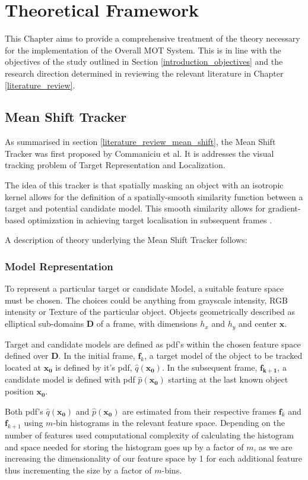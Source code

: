 \chapter{Theoretical Framework}

This Chapter aims to provide a comprehensive treatment of the theory necessary
for the implementation of the Overall MOT System. This is in line with the
objectives of the study outlined in Section \ref{introduction_objectives} and
the research direction determined in reviewing the relevant literature in
Chapter \ref{literature_review}.

\section{Mean Shift Tracker}
As summarised in section \ref{literature_review_mean_shift}, the Mean Shift Tracker was
first proposed by Commaniciu et al. It is addresses the
visual tracking problem of Target Representation and Localization.

The idea of this tracker is that spatially masking an object with an
isotropic kernel allows for the definition of a spatially-smooth similarity
function between a target and potential candidate model. This smooth similarity
allows for gradient-based optimization in achieving target localisation in
subsequent frames \cite{Comaniciu2003}.

A description of theory underlying the Mean Shift Tracker follows:

\subsection{Model Representation}
To represent a particular target or candidate Model, a suitable feature space
must be chosen. The choices could be anything from grayscale intensity, RGB
intensity or Texture of the particular object. Objects geometrically described 
as elliptical sub-domains $\mathbf{D}$ of a frame, with dimensions $h_x$ and
$h_y$ and center $\mathbf{x}$.

Target and candidate models are defined as pdf's within the chosen feature
space defined over $\mathbf{D}$. In the initial frame, $\mathbf{f}_k$, a target
model of the object to be tracked located at $\mathbf{x_0}$ is defined by it's
pdf, $\hat{q}(\mathbf{x_0})$. In the subsequent frame, $\mathbf{f_{k+1}}$, a
candidate model is defined with pdf $\hat{p}(\mathbf{x_0})$ starting at the last
known object position $\mathbf{x_0}$. 

Both pdf's $\hat{q}(\mathbf{x_0})$ and $\hat{p}(\mathbf{x_0})$ are estimated from
their respective frames $\mathbf{f}_k$ and $\mathbf{f}_{k+1}$ using $m$-bin
histograms in the relevant feature space. Depending on the number of
features used computational complexity of calculating the histogram and space
needed for storing the histogram goes up by a factor of $m$, as we are
increasing the dimensionality of our feature space by 1 for each additional
feature thus incrementing the size by a factor of $m$-bins.

